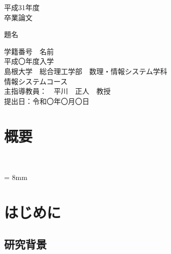 \documentclass[a4j,10.5pt]{jreport}
\begin{document}
\begin{titlepage}

\vspace{40mm}
\begin{center}
{\Large 平成31年度\\卒業論文}\\[80mm]
\end{center}

\begin{center}
{\huge 題名}\\[100mm]
\end{center}

\begin{flushright}
{\large 学籍番号　名前}\\[1mm]
{\large 平成〇年度入学}\\[1mm]
{\large 島根大学　総合理工学部　数理・情報システム学科}\\[1mm]
{\large 情報システムコース}\\[8mm]
{\large 主指導教員：　平川　正人　教授}\\[3mm]
{\large 提出日：令和〇年〇月〇日}\\%
\end{flushright}
\end{titlepage}

\newpage

\chapter*{概要}


\tableofcontents

\listoftables %

\listoffigures　%

\baselineskip = 8mm

\clearpage




\chapter{はじめに}
\section{研究背景}
\end{document}
